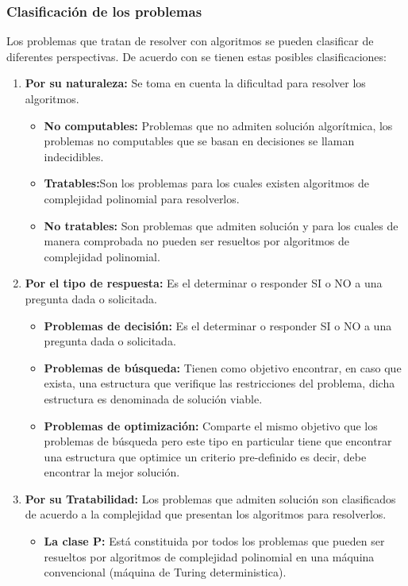 \subsubsection{Clasificación de los problemas}
Los problemas que tratan de resolver con algoritmos se pueden clasificar de diferentes perspectivas. De acuerdo con \cite{[MIGADA]} se tienen estas posibles clasificaciones:
\begin{enumerate}
\item 
\textbf{Por su naturaleza: }Se toma en cuenta la dificultad para resolver los algoritmos.
    \begin{itemize}
    \item \textbf{No computables: }Problemas que no admiten solución algorítmica, los problemas no computables que se basan en decisiones se llaman indecidibles.
    \item \textbf{Tratables:}Son los problemas para los cuales existen algoritmos de complejidad polinomial para resolverlos.
    \item \textbf{No tratables: }Son problemas que admiten solución y para los cuales de manera comprobada no pueden ser resueltos por algoritmos de complejidad polinomial.
    \end{itemize}
\item 
\textbf{Por el tipo de respuesta: }Es el determinar o responder SI o NO a una pregunta dada o solicitada.
\begin{itemize}
    \item \textbf{Problemas de decisión: }Es el determinar o responder SI o NO a una pregunta dada o solicitada.
    \item \textbf{Problemas de búsqueda: }Tienen como objetivo encontrar, en caso que exista, una estructura que verifique las restricciones del problema, dicha estructura es denominada de solución viable.
    \item \textbf{Problemas de optimización: }Comparte el mismo objetivo que los problemas de búsqueda pero este tipo en particular tiene que encontrar una estructura que optimice un criterio pre-definido es decir, debe encontrar la mejor solución. 
\end{itemize}
\item 
\textbf{Por su Tratabilidad: }Los problemas que admiten solución son clasificados de acuerdo a la complejidad que presentan los algoritmos para resolverlos.
\begin{itemize}
\item \textbf{La clase P: }Está constituida por todos los problemas que pueden ser resueltos por algoritmos de complejidad polinomial en una máquina convencional (máquina de Turing deterministica).

\end{itemize}
\end{enumerate}
